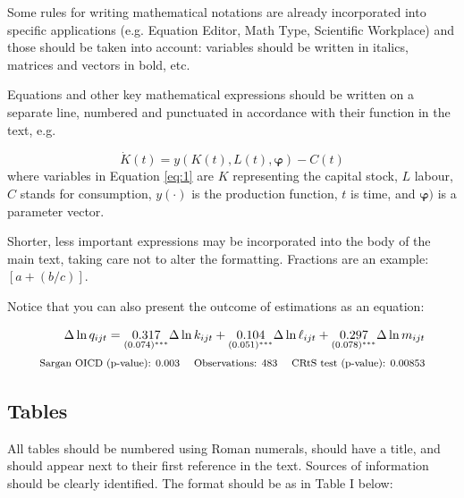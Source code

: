 \documentclass [12pt,a4paper,oneside]{article}
\begin{document}
Some rules for writing mathematical notations are already incorporated into specific applications (e.g. Equation Editor, Math Type, Scientific Workplace) and those should be taken into account: variables should be written in italics, matrices and vectors in bold, etc.

Equations and other key mathematical expressions should be written on a separate line, numbered and punctuated in accordance with their function in the text, e.g.

\begin{equation}\label{eq:1}
\dot{K}(t) = y(K(t), L(t), \bm{\varphi}) - C(t)
\end{equation}
where variables in Equation \ref{eq:1} are $K$ representing the capital stock, $L$ labour, $C$ stands for consumption, $y(\bm{\cdot})$ is the production function, $t$ is time, and $\bm{\varphi})$ is a parameter vector.

Shorter, less important expressions may be incorporated into the body of the main text, taking care not to alter the formatting. Fractions are an example: $[a + (b/c)]$.

Notice that you can also present the outcome of estimations as an equation:

\begin{equation}\label{eq:2}
\begin{split}
\Delta \ln q_{ijt} = \underset{(0.074)^{***}}{0.317} \Delta \ln k_{ijt} + \underset{(0.051)^{***}}{0.104} \Delta \ln \ell_{ijt} + \underset{(0.078)^{***}}{0.297} \Delta \ln m_{ijt}
\\
{\footnotesize\textrm{Sargan OICD (p-value): 0.003 \quad Observations: 483 \quad CRtS test (p-value): 0.00853}}
\end{split}
\end{equation}


	\subsection{Tables}\label{subsec:tables}

All tables should be numbered using Roman numerals, should have a title, and should appear next to their first reference in the text. Sources of information should be clearly identified. The format should be as in Table I below:
\end{document}
